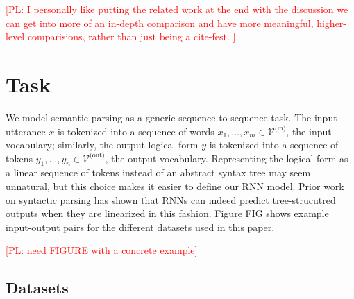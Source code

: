 \documentclass[11pt,letterpaper]{article}
\newcommand{\atis}{\textsc{ATIS}\xspace}
\newcommand{\regex}{\textsc{Regex}\xspace}
\newcommand{\geo}{\textsc{Geo}\xspace}
\newcommand{\vocabin}{\mathcal{V}^{\text{(in)}}}
\newcommand{\vocabout}{\mathcal{V}^{\text{(out)}}}
\newcommand\pl[1]{\textcolor{red}{[PL: #1]}}
\begin{document}
\pl{I personally like putting the related work at the end with the discussion
we can get into more of an in-depth comparison and have more meaningful,
higher-level comparisions, rather than just being a cite-fest.
}

\section{Task}
We model semantic parsing as a generic sequence-to-sequence task.
The input utterance $x$ is tokenized into a sequence of words $x_1, \dotsc, x_m
\in \vocabin$, the input vocabulary;
similarly, the output logical form $y$ is tokenized
into a sequence of tokens $y_1, \dotsc, y_n \in \vocabout$, the output vocabulary.
Representing the logical form as a linear sequence of tokens
instead of an abstract syntax tree may seem unnatural,
but this choice makes it easier to define our RNN model.
Prior work on syntactic parsing 
\cite{vinyals2015grammar} has shown that
RNNs can indeed predict tree-strucutred outputs
when they are linearized in this fashion.
Figure FIG shows example input-output pairs for the different
datasets used in this paper.


\pl{need FIGURE with a concrete example}

\subsection{Datasets}
\end{document}
